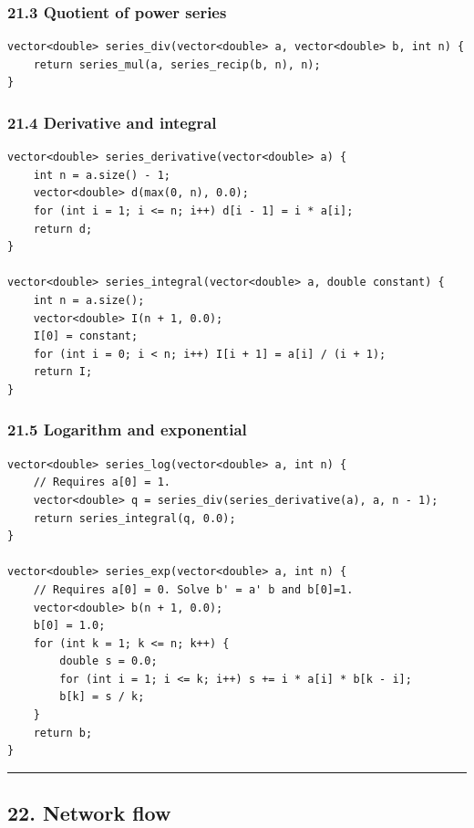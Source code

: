 \documentclass[11pt]{article}
\begin{document}
\subsubsection{21.3 Quotient of power series}\label{quotient-of-power-series}

\begin{verbatim}
vector<double> series_div(vector<double> a, vector<double> b, int n) {
    return series_mul(a, series_recip(b, n), n);
}
\end{verbatim}

\subsubsection{21.4 Derivative and integral}\label{derivative-and-integral}

\begin{verbatim}
vector<double> series_derivative(vector<double> a) {
    int n = a.size() - 1;
    vector<double> d(max(0, n), 0.0);
    for (int i = 1; i <= n; i++) d[i - 1] = i * a[i];
    return d;
}

vector<double> series_integral(vector<double> a, double constant) {
    int n = a.size();
    vector<double> I(n + 1, 0.0);
    I[0] = constant;
    for (int i = 0; i < n; i++) I[i + 1] = a[i] / (i + 1);
    return I;
}
\end{verbatim}

\subsubsection{21.5 Logarithm and exponential}\label{logarithm-and-exponential}

\begin{verbatim}
vector<double> series_log(vector<double> a, int n) {
    // Requires a[0] = 1.
    vector<double> q = series_div(series_derivative(a), a, n - 1);
    return series_integral(q, 0.0);
}

vector<double> series_exp(vector<double> a, int n) {
    // Requires a[0] = 0. Solve b' = a' b and b[0]=1.
    vector<double> b(n + 1, 0.0);
    b[0] = 1.0;
    for (int k = 1; k <= n; k++) {
        double s = 0.0;
        for (int i = 1; i <= k; i++) s += i * a[i] * b[k - i];
        b[k] = s / k;
    }
    return b;
}
\end{verbatim}

\begin{center}\rule{0.5\linewidth}{0.5pt}\end{center}

\subsection{22. Network flow}\label{network-flow}
\end{document}
